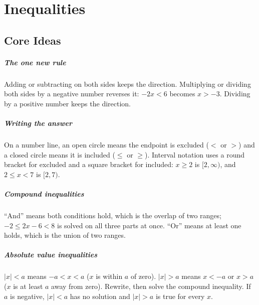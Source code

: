 \chapter{Inequalities}


\section{Core Ideas}

\paragraph{The one new rule} Adding or subtracting on both sides keeps the direction. Multiplying or dividing both sides by a negative number reverses it: $-2x < 6$ becomes $x > -3$. Dividing by a positive number keeps the direction.

\paragraph{Writing the answer} On a number line, an open circle means the endpoint is excluded ($<$ or $>$) and a closed circle means it is included ($\le$ or $\ge$). Interval notation uses a round bracket for excluded and a square bracket for included: $x \ge 2$ is $[2, \infty)$, and $2 \le x < 7$ is $[2, 7)$.

\paragraph{Compound inequalities} ``And'' means both conditions hold, which is the overlap of two ranges; $-2 \le 2x - 6 < 8$ is solved on all three parts at once. ``Or'' means at least one holds, which is the union of two ranges.

\paragraph{Absolute value inequalities} $|x| < a$ means $-a < x < a$ ($x$ is within $a$ of zero). $|x| > a$ means $x < -a$ or $x > a$ ($x$ is at least $a$ away from zero). Rewrite, then solve the compound inequality. If $a$ is negative, $|x| < a$ has no solution and $|x| > a$ is true for every $x$.

